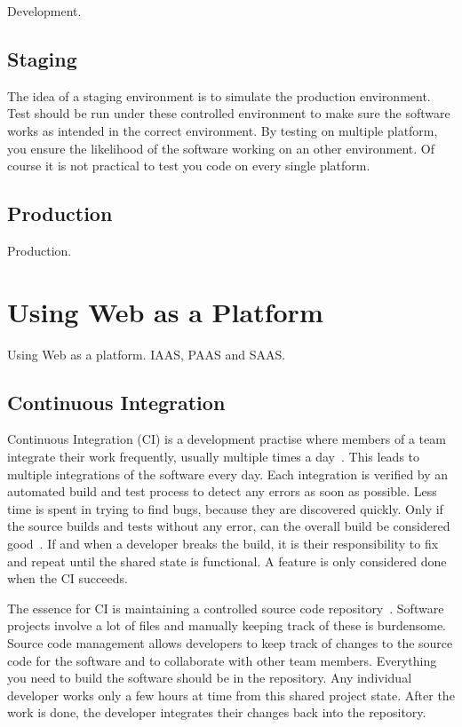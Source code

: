 \documentclass[english]{tktltiki2}
\begin{document}
Development.

\subsection{Staging}

The idea of a staging environment is to simulate the production environment. Test should be run under these controlled environment to make sure the software works as intended in the correct environment. By testing on multiple platform, you ensure the likelihood of the software working on an other environment. Of course it is not practical to test you code on every single platform.

\subsection{Production}

Production.


\section{Using Web as a Platform}

Using Web as a platform. IAAS, PAAS and SAAS.

\subsection{Continuous Integration}

Continuous Integration (CI) is a development practise where members of a team integrate their work frequently, usually multiple times a day~\cite{Fow06}. This leads to multiple integrations of the software every day. Each integration is verified by an automated build and test process to detect any errors as soon as possible. Less time is spent in trying to find bugs, because they are discovered quickly. Only if the source builds and tests without any error, can the overall build be considered good~\cite{Fow06}. If and when a developer breaks the build, it is their responsibility to fix and repeat until the shared state is functional. A feature is only considered done when the CI succeeds.

The essence for CI is maintaining a controlled source code repository~\cite{Fow06}. Software projects involve a lot of files and manually keeping track of these is burdensome. Source code management allows developers to keep track of changes to the source code for the software and to collaborate with other team members. Everything you need to build the software should be in the repository. Any individual developer works only a few hours at time from this shared project state. After the work is done, the developer integrates their changes back into the repository.
\end{document}
